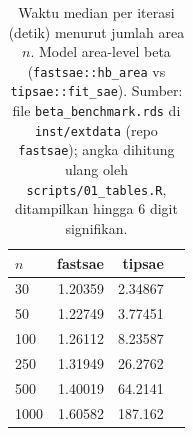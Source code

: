 \begin{table}[htbp]
\centering
\caption{Waktu median per iterasi (detik) menurut jumlah area $n$. Model area-level beta (\texttt{fastsae::hb\_area} vs \texttt{tipsae::fit\_sae}). Sumber: file \texttt{beta\_benchmark.rds} di \texttt{inst/extdata} (repo \texttt{fastsae}); angka dihitung ulang oleh \texttt{scripts/01\_tables.R}, ditampilkan hingga 6 digit signifikan.}
\label{tab:time-beta}
\small
\begin{tabular}{lrrr}
\toprule
$n$ & fastsae & tipsae \\
\midrule
30 & 1.20359 & 2.34867 \\
50 & 1.22749 & 3.77451 \\
100 & 1.26112 & 8.23587 \\
250 & 1.31949 & 26.2762 \\
500 & 1.40019 & 64.2141 \\
1000 & 1.60582 & 187.162 \\
\bottomrule
\end{tabular}
\end{table}

